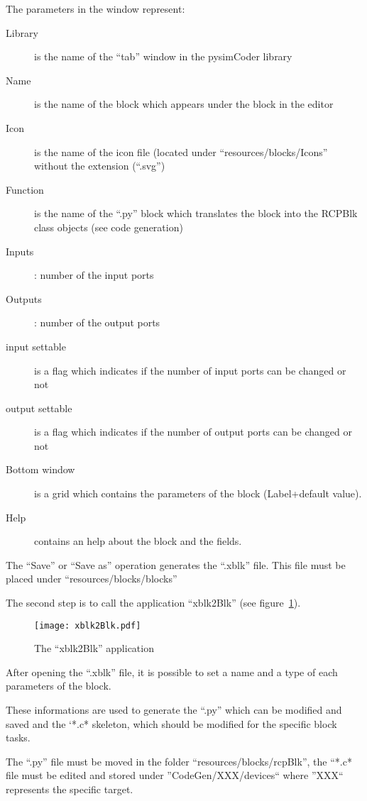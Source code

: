 The parameters in the window represent:
\begin{description}
\item[Library] is the name of the ``tab'' window in the pysimCoder library
\item [Name] is the name of the block which appears under the block in the editor
\item [Icon] is the name of the icon file (located under ``resources/blocks/Icons'' without the extension (``.svg'')
\item [Function] is the name of the ``.py'' block which translates the block into the RCPBlk class objects (see code generation)
\item [Inputs]: number of the input ports
\item [Outputs]: number of the output ports
\item [input settable]is a flag which indicates if the number of input ports can be changed or not
\item [output settable]is a flag which indicates if the number of output ports can be changed or not
\item [Bottom window] is a grid which contains the parameters of the block (Label+default value).
\item [Help] contains an help about the block and the fields.
\end{description}

The ``Save'' or ``Save as'' operation generates the ``.xblk'' file. This file must be placed under ``resources/blocks/blocks''

The second step is to call the application ``xblk2Blk'' (see figure~\ref{Fig:xblk2Blk}).

\begin{figure}[htbp]	%
\centering
\texttt{[image: xblk2Blk.pdf]}
\caption{The ``xblk2Blk'' application}
\label{Fig:xblk2Blk}
\end{figure}

After opening the ``.xblk'' file, it is possible to set a name and a type of each parameters of the block.

These informations are used to generate the ``.py'' which can be modified and saved and the `*.c* skeleton, which should be modified for the specific block tasks.

The ``.py'' file must be moved in the folder ``resources/blocks/rcpBlk'', the ``*.c* file must be edited and stored under ''CodeGen/XXX/devices`` where ''XXX`` represents the specific target.

